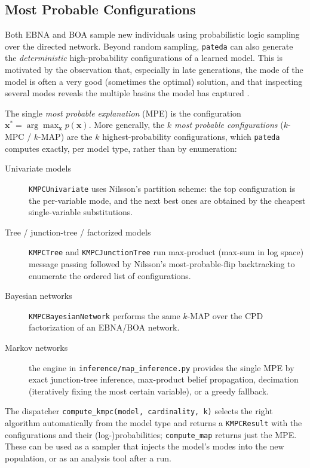 \documentclass[a4paper,11pt]{article}
\begin{document}
\subsection{Most Probable Configurations}
\label{sec:mpe}

Both EBNA and BOA sample new individuals using probabilistic logic sampling over the directed network. Beyond random sampling, \texttt{pateda} can also generate the \emph{deterministic} high-probability configurations of a learned model. This is motivated by the observation that, especially in late generations, the mode of the model is often a very good (sometimes the optimal) solution, and that inspecting several modes reveals the multiple basins the model has captured \citep{Echegoyen_et_al:2007}.

The single \emph{most probable explanation} (MPE) is the configuration
$\mathbf{x}^\ast = \arg\max_{\mathbf{x}} p(\mathbf{x})$. More generally, the
\emph{$k$ most probable configurations} ($k$-MPC / $k$-MAP) are the $k$ highest-probability
configurations, which \texttt{pateda} computes exactly, per model type, rather than by
enumeration:

\begin{description}
  \item[Univariate models] \texttt{KMPCUnivariate} uses Nilsson's partition
    scheme: the top configuration is the per-variable mode, and the next best
    ones are obtained by the cheapest single-variable substitutions.
  \item[Tree / junction-tree / factorized models]
    \texttt{KMPCTree} and \texttt{KMPCJunctionTree} run max-product (max-sum in
    log space) message passing followed by Nilsson's most-probable-flip
    backtracking to enumerate the ordered list of configurations.
  \item[Bayesian networks] \texttt{KMPCBayesianNetwork} performs the same
    $k$-MAP over the CPD factorization of an EBNA/BOA network.
  \item[Markov networks] the engine in
    \texttt{inference/map\_inference.py} provides the single MPE by exact
    junction-tree inference, max-product belief propagation, decimation
    (iteratively fixing the most certain variable), or a greedy fallback.
\end{description}

The dispatcher \texttt{compute\_kmpc(model, cardinality, k)} selects the right
algorithm automatically from the model type and returns a \texttt{KMPCResult}
with the configurations and their (log-)probabilities; \texttt{compute\_map}
returns just the MPE. These can be used as a sampler that injects the model's
modes into the new population, or as an analysis tool after a run.
\end{document}
